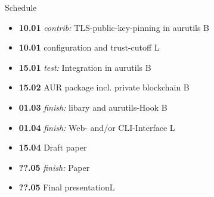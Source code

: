 \documentclass{beamer}
\begin{document}
\begin{frame}{Schedule}
\begin{itemize}
	\item \textbf{10.01} \emph{contrib:} TLS-public-key-pinning in aurutils \hfill B
	\item \textbf{10.01} configuration and trust-cutoff \hfill L
	\item \textbf{15.01} \emph{test:} \alert{Integration in aurutils} \hfill B
	\item \textbf{15.02} \alert{AUR package} incl. private blockchain \hfill B
	\item \textbf{01.03} \emph{finish:} libary and aurutils-Hook \hfill B
	\item \textbf{01.04} \emph{finish:} Web- and/or CLI-Interface \hfill L
	\item \textbf{15.04} \alert{Draft paper} \hfill
	\item \textbf{??.05} \emph{finish:} Paper\hfill
	\item \textbf{??.05} Final presentation\hfill L
\end{itemize}
\end{frame}
\end{document}
